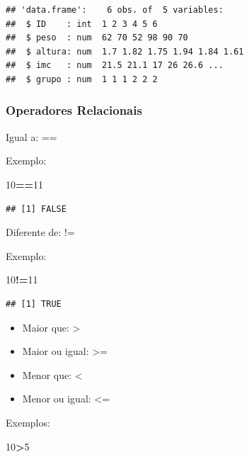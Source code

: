 \documentclass[
]{book}
\newenvironment{Shaded}{\begin{snugshade}}{\end{snugshade}}
\newcommand{\DecValTok}[1]{\textcolor[rgb]{0.00,0.00,0.81}{#1}}
\newcommand{\OperatorTok}[1]{\textcolor[rgb]{0.81,0.36,0.00}{\textbf{#1}}}
\begin{document}
\begin{verbatim}
## 'data.frame':	6 obs. of  5 variables:
##  $ ID    : int  1 2 3 4 5 6
##  $ peso  : num  62 70 52 98 90 70
##  $ altura: num  1.7 1.82 1.75 1.94 1.84 1.61
##  $ imc   : num  21.5 21.1 17 26 26.6 ...
##  $ grupo : num  1 1 1 2 2 2
\end{verbatim}

\hypertarget{operadores-relacionais}{%
\subsubsection{Operadores Relacionais}\label{operadores-relacionais}}

Igual a: ==

Exemplo:

\begin{Shaded}
\begin{Highlighting}[]
\DecValTok{10}\OperatorTok{==}\DecValTok{11}
\end{Highlighting}
\end{Shaded}

\begin{verbatim}
## [1] FALSE
\end{verbatim}

Diferente de: !=

Exemplo:

\begin{Shaded}
\begin{Highlighting}[]
\DecValTok{10}\OperatorTok{!=}\DecValTok{11}
\end{Highlighting}
\end{Shaded}

\begin{verbatim}
## [1] TRUE
\end{verbatim}

\begin{itemize}
\item
  Maior que: \textgreater{}
\item
  Maior ou igual: \textgreater=
\item
  Menor que: \textless{}
\item
  Menor ou igual: \textless=
\end{itemize}

Exemplos:

\begin{Shaded}
\begin{Highlighting}[]
\DecValTok{10}\OperatorTok{>}\DecValTok{5}
\end{Highlighting}
\end{Shaded}
\end{document}
